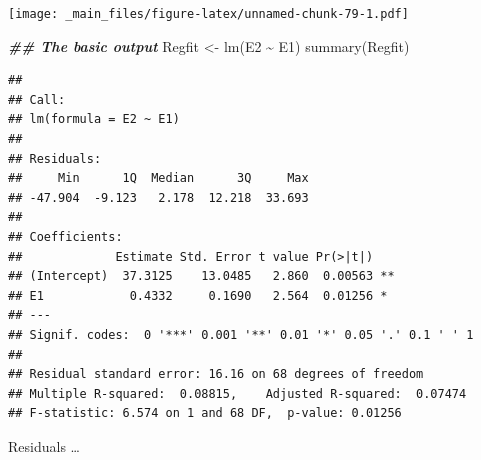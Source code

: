 \documentclass[
]{book}
\newenvironment{Shaded}{\begin{snugshade}}{\end{snugshade}}
\newcommand{\DocumentationTok}[1]{\textcolor[rgb]{0.56,0.35,0.01}{\textbf{\textit{#1}}}}
\newcommand{\FunctionTok}[1]{\textcolor[rgb]{0.00,0.00,0.00}{#1}}
\newcommand{\NormalTok}[1]{#1}
\newcommand{\OtherTok}[1]{\textcolor[rgb]{0.56,0.35,0.01}{#1}}
\newcommand{\SpecialCharTok}[1]{\textcolor[rgb]{0.00,0.00,0.00}{#1}}
\begin{document}
\texttt{[image: \_main\_files/figure-latex/unnamed-chunk-79-1.pdf]}

\begin{Shaded}
\begin{Highlighting}[]
\DocumentationTok{\#\# The basic output}
\NormalTok{Regfit }\OtherTok{\textless{}{-}} \FunctionTok{lm}\NormalTok{(E2 }\SpecialCharTok{\textasciitilde{}}\NormalTok{ E1)}
\FunctionTok{summary}\NormalTok{(Regfit)}
\end{Highlighting}
\end{Shaded}

\begin{verbatim}
## 
## Call:
## lm(formula = E2 ~ E1)
## 
## Residuals:
##     Min      1Q  Median      3Q     Max 
## -47.904  -9.123   2.178  12.218  33.693 
## 
## Coefficients:
##             Estimate Std. Error t value Pr(>|t|)   
## (Intercept)  37.3125    13.0485   2.860  0.00563 **
## E1            0.4332     0.1690   2.564  0.01256 * 
## ---
## Signif. codes:  0 '***' 0.001 '**' 0.01 '*' 0.05 '.' 0.1 ' ' 1
## 
## Residual standard error: 16.16 on 68 degrees of freedom
## Multiple R-squared:  0.08815,    Adjusted R-squared:  0.07474 
## F-statistic: 6.574 on 1 and 68 DF,  p-value: 0.01256
\end{verbatim}

Residuals \ldots{}
\end{document}
